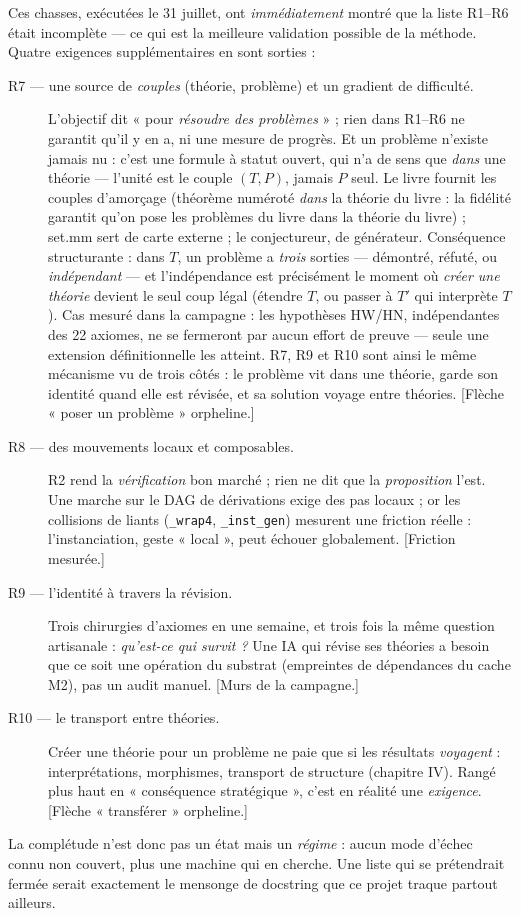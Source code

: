 Ces chasses, exécutées le 31 juillet, ont \emph{immédiatement} montré que la
liste R1--R6 était incomplète --- ce qui est la meilleure validation possible de
la méthode. Quatre exigences supplémentaires en sont sorties :

\begin{description}
\item[R7 --- une source de \emph{couples} (théorie, problème) et un gradient
  de difficulté.] L'objectif dit « pour \emph{résoudre des problèmes} » ; rien
  dans R1--R6 ne garantit qu'il y en a, ni une mesure de progrès. Et un
  problème n'existe jamais nu : c'est une formule à statut ouvert, qui n'a de
  sens que \emph{dans} une théorie --- l'unité est le couple $(T,P)$, jamais
  $P$ seul. Le livre fournit les couples d'amorçage (théorème numéroté
  \emph{dans} la théorie du livre : la fidélité garantit qu'on pose les
  problèmes du livre dans la théorie du livre) ; set.mm sert de carte externe ;
  le conjectureur, de générateur. Conséquence structurante : dans $T$, un
  problème a \emph{trois} sorties --- démontré, réfuté, ou \emph{indépendant}
  --- et l'indépendance est précisément le moment où \emph{créer une théorie}
  devient le seul coup légal (étendre $T$, ou passer à $T'$ qui interprète
  $T$). Cas mesuré dans la campagne : les hypothèses HW/HN, indépendantes des
  22 axiomes, ne se fermeront par aucun effort de preuve --- seule une
  extension définitionnelle les atteint. R7, R9 et R10 sont ainsi le même
  mécanisme vu de trois côtés : le problème vit dans une théorie, garde son
  identité quand elle est révisée, et sa solution voyage entre théories.
  [Flèche « poser un problème » orpheline.]
\item[R8 --- des mouvements locaux et composables.] R2 rend la
  \emph{vérification} bon marché ; rien ne dit que la \emph{proposition} l'est.
  Une marche sur le DAG de dérivations exige des pas locaux ; or les collisions
  de liants (\texttt{\_wrap4}, \texttt{\_inst\_gen}) mesurent une friction
  réelle : l'instanciation, geste « local », peut échouer globalement.
  [Friction mesurée.]
\item[R9 --- l'identité à travers la révision.] Trois chirurgies d'axiomes en
  une semaine, et trois fois la même question artisanale : \emph{qu'est-ce qui
  survit ?} Une IA qui révise ses théories a besoin que ce soit une opération
  du substrat (empreintes de dépendances du cache M2), pas un audit manuel.
  [Murs de la campagne.]
\item[R10 --- le transport entre théories.] Créer une théorie pour un problème
  ne paie que si les résultats \emph{voyagent} : interprétations, morphismes,
  transport de structure (chapitre IV). Rangé plus haut en « conséquence
  stratégique », c'est en réalité une \emph{exigence}. [Flèche « transférer »
  orpheline.]
\end{description}

La complétude n'est donc pas un état mais un \emph{régime} : aucun mode d'échec
connu non couvert, plus une machine qui en cherche. Une liste qui se
prétendrait fermée serait exactement le mensonge de docstring que ce projet
traque partout ailleurs.
